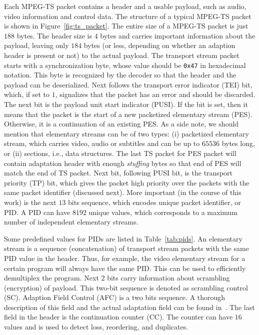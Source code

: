 Each MPEG-TS packet contains a header and a usable payload, such as audio, 
video information and control data. The structure of a typical MPEG-TS 
packet is shown in Figure~\ref{fig:ts_packet}. The entire size of a MPEG-TS packet 
is just $188$ bytes. The header size is $4$ bytes and carries important 
information about the payload, leaving only $184$ bytes (or less, depending 
on whether an adaption header is present or not) to the actual payload. 
The transport stream packet starts with a synchronization byte, whose 
value should be \texttt{0x47} in hexadecimal notation. This byte is 
recognized by the decoder so that the header and the payload can be 
deserialized. Next follows the transport error indicator (TEI) bit, 
which, if set to $1$, signalizes that the packet has an error and should 
be discarded. The next bit is the payload unit start indicator (PUSI). 
If the bit is set, then it means that the packet is the start of a new 
packetized elementary stream (PES). Otherwise, it is a continuation 
of an existing PES. As a side note, we should mention that elementary 
streams can be of two types: (i) packetized elementary stream, which 
carries video, audio or subtitles and can be up to $65536$ bytes
long, or (ii) sections, i.e., data structures. The last TS packet for PES packet
will contain adaptation header with enough \textit{stuffing} bytes so that end of PES
will match the end of TS packet. Next bit, following PUSI bit, is the transport priority
(TP) bit, which gives the packet high priority over the packets with the same
packet identifier (discussed next). More important (in the course of this work) 
is the next $13$ bits sequence, which encodes unique packet identifier, 
or PID. A PID can have $8192$ unique values, which corresponds to a maximum 
number of independent elementary streams.

Some predefined values for PIDs are listed in Table~\ref{tab:pids}. 
An elementary stream is a sequence (concatenation) of transport stream packets 
with the same PID value in the header. Thus, for example, the video elementary 
stream for a certain program will always have the same PID. This can be used
to efficiently demultiplex the program. Next $2$ bits carry information about 
scrambling (encryption) of payload. This two-bit sequence is denoted as 
scrambling control (SC). Adaption Field Control (AFC) is a two bits 
sequence. A thorough description of this field and the actual adaptation field 
can be found in~\cite{MPEG2:overview}. The last field in the header 
is the continuation counter (CC). The counter can have $16$ values and
is used to detect loss, reordering, and duplicates. 

